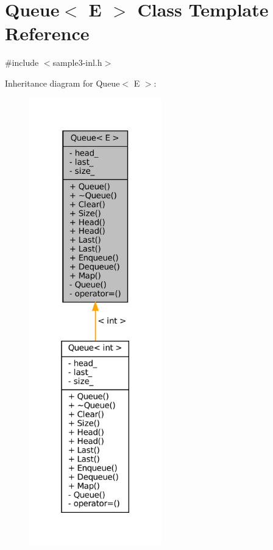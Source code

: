 \hypertarget{classQueue}{}\section{Queue$<$ E $>$ Class Template Reference}
\label{classQueue}


{\ttfamily \#include $<$sample3-\/inl.\+h$>$}



Inheritance diagram for Queue$<$ E $>$\+:
\nopagebreak
\begin{figure}[H]
\begin{center}
\leavevmode
\includegraphics[height=550pt]{classQueue__inherit__graph}
\end{center}
\end{figure}


